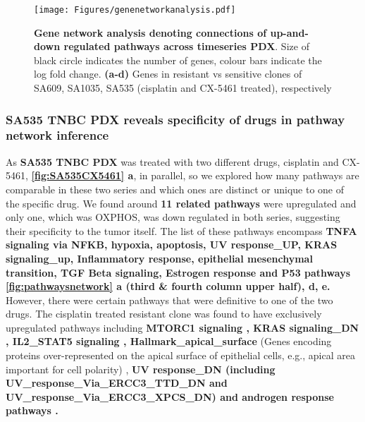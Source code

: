 \begin{figure}
\centering
  \texttt{[image: Figures/genenetworkanalysis.pdf]}
\caption[DE of resistant and sensitive clonealign defined clones]
	{\small
	\textbf{Gene network analysis denoting connections of up-and-down regulated pathways across timeseries PDX}. Size of black circle indicates the number of genes, colour bars indicate the log fold change.
	\textbf{(a-d)} Genes in resistant vs sensitive clones of SA609, SA1035, SA535 (cisplatin and CX-5461 treated), respectively}
	   	\label{fig:genenetworkanalysis}
\end{figure}

\subsubsection{SA535 TNBC PDX reveals specificity of drugs in pathway network inference} 
As \textbf{SA535 TNBC PDX} was treated with two different drugs, cisplatin and CX-5461, \textbf{\autoref{fig:SA535CX5461} a}, in parallel, so we explored how many pathways are comparable in these two series and which ones are distinct or unique to one of the specific drug. 
We found around \textbf{11 related pathways} were upregulated and only one, which was \ac{OXPHOS}, was down regulated in both series, suggesting their specificity to the tumor itself. The list of these pathways encompass \textbf{TNFA signaling via NFKB, hypoxia, apoptosis, UV response\_UP, KRAS signaling\_up, Inflammatory response, epithelial mesenchymal transition, TGF Beta signaling, Estrogen response and P53 pathways \textbf{\autoref{fig:pathwaysnetwork} a (third \& fourth column upper half), d, e}.} However, there were certain pathways that were definitive to one of the two drugs. The cisplatin treated resistant clone was found to have exclusively upregulated pathways including \textbf{MTORC1 signaling \cite{peng2010role}, KRAS signaling\_DN \cite{tao2014oncogenic}, IL2\_STAT5 signaling \cite{wu2020activation, gutierrez2020role}, Hallmark\_apical\_surface} (Genes encoding proteins over-represented on the apical surface of epithelial cells, e.g., apical area important for cell polarity) \cite{halaoui2015rewiring, wodarz2007cell}, \textbf{UV response\_DN (including UV\_response\_Via\_ERCC3\_TTD\_DN
and UV\_response\_Via\_ERCC3\_XPCS\_DN) and androgen response pathways \cite{rampurwala2016role, michmerhuizen2020we}.}


